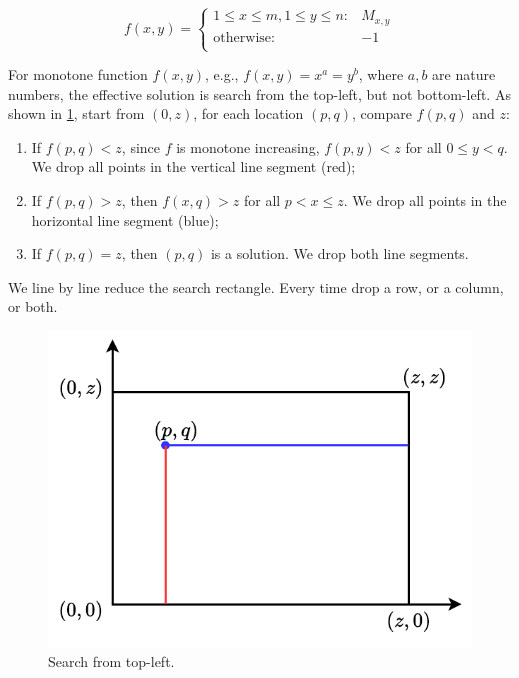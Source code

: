 \documentclass[b5paper]{article}
\begin{document}
\[
f(x, y) = \begin{cases}
  1 \leq x \leq m, 1 \leq y \leq n: & M_{x, y} \\
  \text{otherwise}: & -1 \\
  \end{cases}
\]

For monotone function $f(x, y)$, e.g., $f(x, y) = x^a = y^b$, where $a, b$ are nature numbers, the effective solution is search from the top-left, but not bottom-left\cite{saddle-back}. As shown in \cref{fig:saddleback-1}, start from $(0, z)$, for each location $(p, q)$, compare $f(p, q)$ and $z$:

\begin{enumerate}
\item If $f(p, q) < z$, since $f$ is monotone increasing, $f(p, y) < z$ for all $0 \leq y < q$. We drop all points in the vertical line segment (red);
\item If $f(p, q) > z$, then $f(x, q) > z$ for all $p < x \leq z$. We drop all points in the horizontal line segment (blue);
\item If $f(p, q) = z$, then $(p, q)$ is a solution. We drop both line segments.
\end{enumerate}

We line by line reduce the search rectangle. Every time drop a row, or a column, or both.

\begin{figure}[htbp]
 \centering
 \includegraphics[scale=0.5]{img/saddle-back-start}
 \caption{Search from top-left.}
 \label{fig:saddleback-1}
\end{figure}
\end{document}
